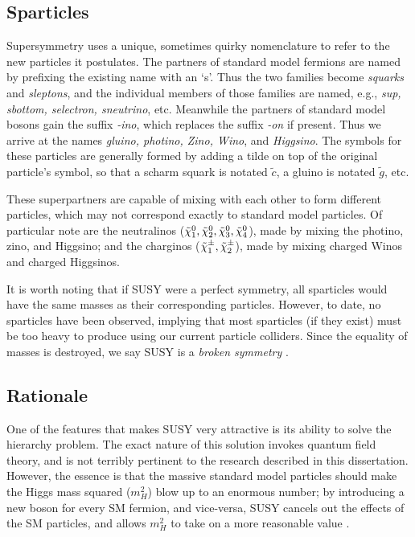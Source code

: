 \subsection{Sparticles}
\label{ssec:susysparticles}

Supersymmetry uses a unique, sometimes quirky nomenclature to refer to
the new particles it postulates. The partners of standard model
fermions are named by prefixing the existing name with an `s'. Thus
the two families become \emph{squarks} and \emph{sleptons}, and the
individual members of those families are named, e.g., \emph{sup,
  sbottom, selectron, sneutrino}, etc. Meanwhile the partners of
standard model bosons gain the suffix \emph{-ino}, which replaces the
suffix \emph{-on} if present. Thus we arrive at the names
\emph{gluino, photino, Zino, Wino}, and \emph{Higgsino}. The symbols
for these particles are generally formed by adding a tilde on top of
the original particle's symbol, so that a scharm squark is notated
$\tilde{c}$, a gluino is notated $\tilde{g}$, etc.

These superpartners are capable of mixing with each other to form
different particles, which may not correspond exactly to standard
model particles. Of particular note are the neutralinos
($\tilde{\chi}^0_1, \tilde{\chi}^0_2, \tilde{\chi}^0_3, \tilde{\chi}^0_4$), made by mixing the photino, zino,
and Higgsino; and the charginos ($\tilde{\chi}^\pm_1, \tilde{\chi}^\pm_2$), made by
mixing charged Winos and charged Higgsinos.

It is worth noting that if SUSY were a perfect symmetry, all
sparticles would have the same masses as their corresponding
particles. However, to date, no sparticles have been
observed, implying that most sparticles (if they exist) must be too
heavy to produce using our current particle colliders. Since the
equality of masses is destroyed, we say SUSY is a \emph{broken
  symmetry} \cite{susyprimer}.

\subsection{Rationale}
\label{ssec:susyrationale}

One of the features that makes SUSY very attractive is its ability to
solve the hierarchy problem. The exact nature of this solution
invokes quantum field theory, and is not terribly pertinent to the
research described in this dissertation. However, the essence is
that the massive standard model particles should make the Higgs mass
squared ($m_H^2$) blow up to an enormous number; by introducing a
new boson for every SM fermion, and vice-versa, SUSY cancels out
the effects of the SM particles, and allows $m_H^2$ to take on a
more reasonable value \cite{susyprimer}.

